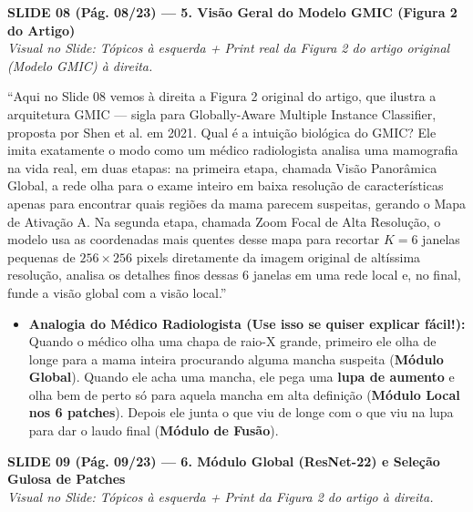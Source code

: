 \documentclass[11pt,a4paper]{article}
\newcommand{\slideheader}[3]{%
    \vspace{10pt}%
    \begin{tcolorbox}[colback=slateborder, colframe=slateborder, coltext=white, boxrule=0pt, arc=3pt, left=8pt, right=8pt, top=5pt, bottom=5pt]
        {\large\bfseries #1 — #2}\\[2pt]
        {\small\itshape Visual no Slide: #3}
    \end{tcolorbox}%
}
\newenvironment{falabox}{%
    \begin{tcolorbox}[colback=speechbg, colframe=speechborder, boxrule=1.2pt, arc=4pt, left=10pt, right=10pt, top=8pt, bottom=8pt, title={\bfseries O QUE VOCÊ DEVE FALAR (Fala Sugerida)}]%
}{%
    \end{tcolorbox}%
}
\newenvironment{explicabox}{%
    \begin{tcolorbox}[colback=explainbg, colframe=explainborder, boxrule=0.8pt, arc=4pt, left=10pt, right=10pt, top=8pt, bottom=8pt, title={\bfseries ENTENDA O QUE VOCÊ ESTÁ FALANDO (Explicação Didática de Cada Termo)}]%
}{%
    \end{tcolorbox}%
}
\begin{document}
\newpage
\slideheader{SLIDE 08 (Pág. 08/23)}{5. Visão Geral do Modelo GMIC (Figura 2 do Artigo)}{Tópicos à esquerda + Print real da Figura 2 do artigo original (Modelo GMIC) à direita.}

\begin{falabox}
``Aqui no Slide 08 vemos à direita a Figura 2 original do artigo, que ilustra a arquitetura GMIC — sigla para Globally-Aware Multiple Instance Classifier, proposta por Shen et al. em 2021. Qual é a intuição biológica do GMIC? Ele imita exatamente o modo como um médico radiologista analisa uma mamografia na vida real, em duas etapas: na primeira etapa, chamada Visão Panorâmica Global, a rede olha para o exame inteiro em baixa resolução de características apenas para encontrar quais regiões da mama parecem suspeitas, gerando o Mapa de Ativação A. Na segunda etapa, chamada Zoom Focal de Alta Resolução, o modelo usa as coordenadas mais quentes desse mapa para recortar $K = 6$ janelas pequenas de $256 \times 256$ pixels diretamente da imagem original de altíssima resolução, analisa os detalhes finos dessas 6 janelas em uma rede local e, no final, funde a visão global com a visão local.''
\end{falabox}

\begin{explicabox}
\begin{itemize}[leftmargin=*, itemsep=4pt]
    \item \textbf{Analogia do Médico Radiologista (Use isso se quiser explicar fácil!):} Quando o médico olha uma chapa de raio-X grande, primeiro ele olha de longe para a mama inteira procurando alguma mancha suspeita (\textbf{Módulo Global}). Quando ele acha uma mancha, ele pega uma \textbf{lupa de aumento} e olha bem de perto só para aquela mancha em alta definição (\textbf{Módulo Local nos 6 patches}). Depois ele junta o que viu de longe com o que viu na lupa para dar o laudo final (\textbf{Módulo de Fusão}).
\end{itemize}
\end{explicabox}

\newpage
\slideheader{SLIDE 09 (Pág. 09/23)}{6. Módulo Global (ResNet-22) e Seleção Gulosa de Patches}{Tópicos à esquerda + Print da Figura 2 do artigo à direita.}
\end{document}
